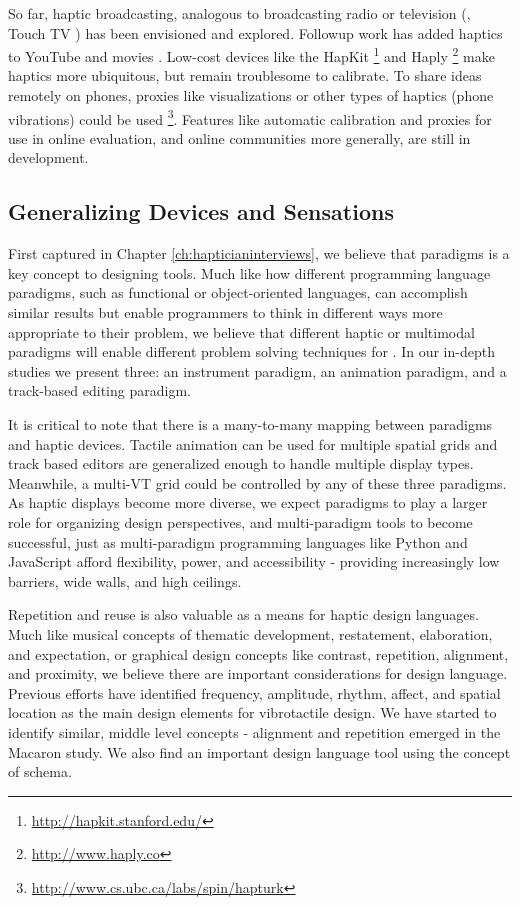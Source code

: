 So far, haptic broadcasting, analogous to broadcasting radio or television (\eg, Touch TV \cite{Modhrain2001}) has been envisioned and explored.
Followup work has added haptics to YouTube \cite{AbdurRahman2010} and movies \cite{Kim2009}.
Low-cost devices like the HapKit \cite{Martinez2016}\footnote{\url{http://hapkit.stanford.edu/}} and Haply \cite{Gallacher2016}\footnote{\url{http://www.haply.co}} make haptics more ubiquitous, but remain troublesome to calibrate.
To share ideas remotely on phones, proxies like visualizations or other types of haptics (phone vibrations) could be used \cite{Schneider2016b}\footnote{\url{http://www.cs.ubc.ca/labs/spin/hapturk}}.
Features like automatic calibration and proxies for use in online evaluation, and online communities more generally, are still in development.




\subsection{Generalizing Devices and Sensations}
First captured in Chapter \ref{ch:hapticianinterviews}, we believe that paradigms is a key concept to designing \haxd tools.
Much like how different programming language paradigms, such as functional or object-oriented languages, can accomplish similar results but enable programmers to think in different ways more appropriate to their problem, we believe that different haptic or multimodal paradigms will enable different problem solving techniques for \haxd.
In our in-depth studies we present three: an instrument paradigm, an animation paradigm, and a track-based editing paradigm.

It is critical to note that there is a many-to-many mapping between paradigms and haptic devices.
Tactile animation can be used for multiple spatial grids and track based editors are generalized enough to handle multiple display types.
Meanwhile, a multi-VT grid could be controlled by any of these three paradigms.
As haptic displays become more diverse, we expect paradigms to play a larger role for organizing design perspectives, and multi-paradigm tools to become successful, just as multi-paradigm programming languages like Python and JavaScript afford flexibility, power, and accessibility - providing increasingly low barriers, wide walls, and high ceilings.


Repetition and reuse is also valuable as a means for haptic design languages.
Much like musical concepts of thematic development, restatement, elaboration, and expectation, or graphical design concepts like contrast, repetition, alignment, and proximity, we believe there are important considerations for design language.
Previous efforts have identified frequency, amplitude, rhythm, affect, and spatial location as the main design elements for vibrotactile design.
We have started to identify similar, middle level concepts - alignment and repetition emerged in the Macaron study.
We also find an important design language tool using the concept of schema.


